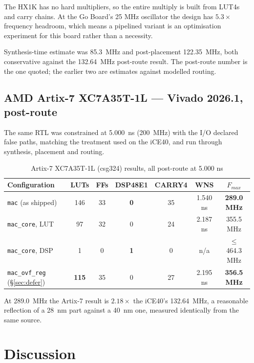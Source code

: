 \documentclass[letterpaper,12pt]{article}
\begin{document}
The HX1K has no hard multipliers, so the entire multiply is built from LUT4s
and carry chains. At the Go Board's 25 MHz oscillator the design has $5.3\times$
frequency headroom, which means a pipelined variant is an optimisation
experiment for this board rather than a necessity.

Synthesis-time estimate was 85.3~MHz and post-placement 122.35~MHz, both
conservative against the 132.64~MHz post-route result. The post-route number is
the one quoted; the earlier two are estimates against modelled routing.

\subsection{AMD Artix-7 XC7A35T-1L --- Vivado 2026.1, post-route}

The same RTL was constrained at 5.000~ns (200~MHz) with the I/O declared false
paths, matching the treatment used on the iCE40, and run through synthesis,
placement and routing.

\begin{table}[H]
\centering
\caption{Artix-7 XC7A35T-1L (csg324) results, all post-route at 5.000 ns}
\label{tab:artix}
\renewcommand{\arraystretch}{1.3}
\begin{tabular}{|l|c|c|c|c|c|c|}
\hline
\textbf{Configuration} & \textbf{LUTs} & \textbf{FFs} & \textbf{DSP48E1} & \textbf{CARRY4} & \textbf{WNS} & \textbf{$F_{max}$} \\
\hline
\texttt{mac} (as shipped)      & 146 & 33 & \textbf{0} & 35 & 1.540 ns & \textbf{289.0 MHz} \\
\texttt{mac\_core}, LUT        & 97  & 32 & 0 & 24 & 2.187 ns & 355.5 MHz \\
\texttt{mac\_core}, DSP        & 1   & 0  & \textbf{1} & 0 & n/a & $\leq$ 464.3 MHz \\
\hline
\texttt{mac\_ovf\_reg} (\S\ref{sec:defer}) & \textbf{115} & 35 & 0 & 27 & 2.195 ns & \textbf{356.5 MHz} \\
\hline
\end{tabular}
\end{table}

At 289.0~MHz the Artix-7 result is $2.18\times$ the iCE40's 132.64~MHz, a
reasonable reflection of a 28~nm part against a 40~nm one, measured identically
from the same source.

\section{Discussion}
\end{document}
